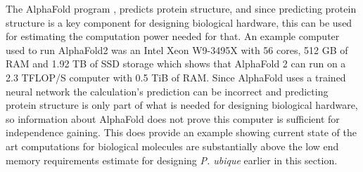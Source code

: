 \documentclass[letterpaper,twocolumn]{article}
\begin{document}
The AlphaFold program \citep{Jumper2021,Abramson2024}, predicts
protein structure, and since predicting protein structure is a key
component for designing biological hardware, this can be used for
estimating the computation power needed for that. An example computer
used to run AlphaFold2 was an Intel Xeon W9-3495X with 56 cores, 512
GB of RAM and 1.92 TB of SSD storage \citep{alphafoldbenchmark} which
shows that AlphaFold 2 can run on a 2.3 TFLOP/S computer with 0.5 TiB
of RAM. Since AlphaFold uses a trained neural network the
calculation's prediction can be incorrect and predicting protein
structure is only part of what is needed for designing biological
hardware, so information about AlphaFold does not prove this computer
is sufficient for independence gaining. This does provide an example
showing current state of the art computations for biological molecules
are substantially above the low end memory requirements estimate for designing
{\em P. ubique} earlier in this section.



\end{document}
